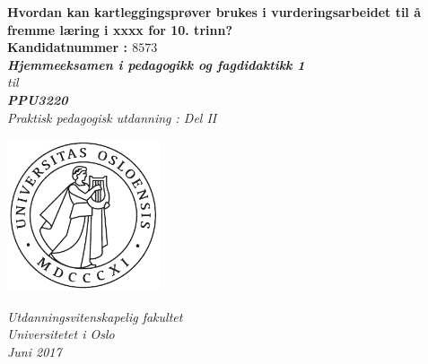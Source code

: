 \documentclass[main.tex]{subfiles}
\begin{document}
\thispagestyle{empty}
\begin{center}        %
  \vspace{5mm}        %
  \LARGE
  \textbf{Hvordan kan kartleggingsprøver brukes i vurderingsarbeidet til å fremme læring i 
          xxxx for 10. trinn?} \\
  \Large
  \vspace{10mm}
  \large
  \textbf{Kandidatnummer : $8573$} \\
  \vspace{20mm}
  \Large
  {\bf{\textsl{Hjemmeeksamen i pedagogikk og fagdidaktikk 1}}} \\
  \textsl{til} \\
  \vspace{2mm}
  {\bf{\textsl{PPU3220}}} \\
  \vspace{5mm}
  {\large \textsl {Praktisk pedagogisk utdanning : Del II}}\\
  \vspace{10mm}
  \centerline{\includegraphics[width=45mm,height=45mm]{../figures/uiosegl.pdf}} 
  \vspace{8mm}
  \textsl{Utdanningsvitenskapelig fakultet} \\
  \textsl{Universitetet i Oslo} \\
  \vspace{5mm}
  \large
  \textsl{Juni 2017} \\
  \vspace{2cm}


\end{center}
\end{document}
